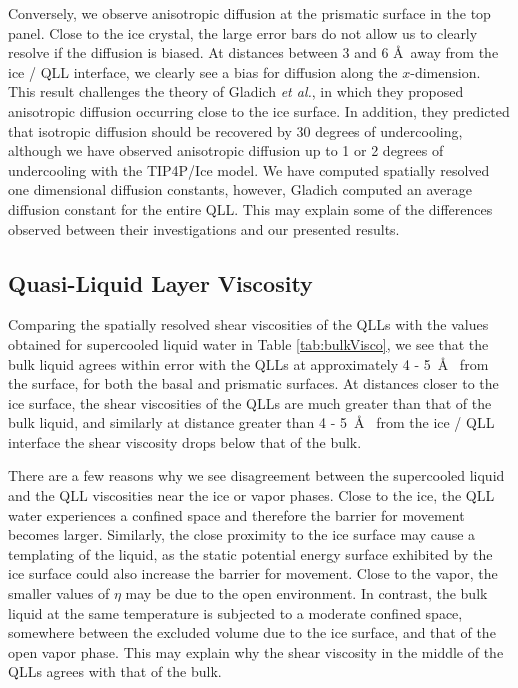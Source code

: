 Conversely, we observe anisotropic diffusion at the prismatic surface
in the top panel. Close to the ice crystal, the large error bars do
not allow us to clearly resolve if the diffusion is biased. At
distances between 3 and 6 \AA~away from the ice / QLL interface, we
clearly see a bias for diffusion along the $x$-dimension. This result
challenges the theory of Gladich \textit{et al.}, in which they
proposed anisotropic diffusion occurring close to the ice surface. In
addition, they predicted that isotropic diffusion should be recovered
by 30 degrees of undercooling, although we have observed anisotropic
diffusion up to 1 or 2 degrees of undercooling with the TIP4P/Ice
model. We have computed spatially resolved one dimensional diffusion
constants, however, Gladich computed an average diffusion constant for
the entire QLL. This may explain some of the differences observed
between their investigations and our presented results.

\subsection{Quasi-Liquid Layer Viscosity}
Comparing the spatially resolved shear viscosities of the QLLs with
the values obtained for supercooled liquid water in Table
\ref{tab:bulkVisco}, we see that the bulk liquid agrees within error
with the QLLs at approximately 4 - 5~\AA~ from the surface, for both
the basal and prismatic surfaces. At distances closer to the ice
surface, the shear viscosities of the QLLs are much greater than that
of the bulk liquid, and similarly at distance greater than 4 - 5~\AA~
from the ice / QLL interface the shear viscosity drops below that of
the bulk.

There are a few reasons why we see disagreement between the
supercooled liquid and the QLL viscosities near the ice or vapor
phases. Close to the ice, the QLL water experiences a confined space
and therefore the barrier for movement becomes larger. Similarly, the
close proximity to the ice surface may cause a templating of the
liquid, as the static potential energy surface exhibited by the ice
surface could also increase the barrier for movement. Close to the
vapor, the smaller values of $\eta$ may be due to the open
environment.  In contrast, the bulk liquid at the same temperature is
subjected to a moderate confined space, somewhere between the
excluded volume due to the ice surface, and that of the open vapor
phase. This may explain why the shear viscosity in the middle of the
QLLs agrees with that of the bulk. 

